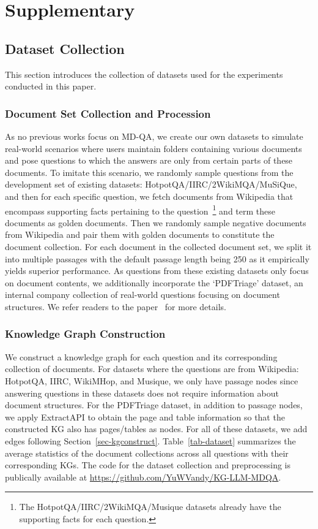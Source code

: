 \clearpage
\newpage
\section{Supplementary}
\subsection{Dataset Collection}\label{sup-datacollect}
This section introduces the collection of datasets used for the experiments conducted in this paper.

\subsubsection{Document Set Collection and Procession}
As no previous works focus on MD-QA, we create our own datasets to simulate real-world scenarios where users maintain folders containing various documents and pose questions to which the answers are only from certain parts of these documents. To imitate this scenario, we randomly sample questions from the development set of existing datasets: HotpotQA/IIRC/2WikiMQA/MuSiQue, and then for each specific question, we fetch documents from Wikipedia that encompass supporting facts pertaining to the question~\footnote{The HotpotQA/IIRC/2WikiMQA/Musique datasets already have the supporting facts for each question.} and term these documents as golden documents. Then we randomly sample negative documents from Wikipedia and pair them with golden documents to constitute the document collection. For each document in the collected document set, we split it into multiple passages with the default passage length being 250 as it empirically yields superior performance. As questions from these existing datasets only focus on document contents, we additionally incorporate the `PDFTriage' dataset, an internal company collection of real-world questions focusing on document structures. We refer readers to the paper~\cite{saad2023pdftriage} for more details.

\subsubsection{Knowledge Graph Construction}
We construct a knowledge graph for each question and its corresponding collection of documents. For datasets where the questions are from Wikipedia: HotpotQA, IIRC, WikiMHop, and Musique, we only have passage nodes since answering questions in these datasets does not require information about document structures. For the PDFTriage dataset, in addition to passage nodes, we apply ExtractAPI to obtain the page and table information so that the constructed KG also has pages/tables as nodes. For all of these datasets, we add edges following Section~\ref{sec-kgconstruct}. Table~\ref{tab-dataset} summarizes the average statistics of the document collections across all questions with their corresponding KGs. The code for the dataset collection and preprocessing is publically available at \url{https://github.com/YuWVandy/KG-LLM-MDQA}.

